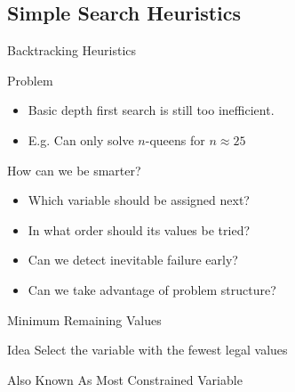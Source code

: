 \documentclass[14pt]{beamer}
\begin{document}
\subsection{Simple Search Heuristics}
\begin{frame}{Backtracking Heuristics}
	\begin{block}{Problem}
		\begin{itemize}
			\item Basic depth first search is still too inefficient.
			\item E.g. Can only solve $n$-queens for $n \approx 25$
		\end{itemize}
	\end{block}
	\begin{block}{How can we be smarter?}
		\begin{itemize}
			\pause
			\item Which variable should be assigned next?
			\pause
			\item In what order should its values be tried?
			\pause
			\item Can we detect inevitable failure early?
			\pause
			\item Can we take advantage of problem structure?
		\end{itemize}
	\end{block}
\end{frame}
\begin{frame}{Minimum Remaining Values}
	\begin{block}{Idea}
		Select the variable with the fewest legal values \\
	\end{block}
	\pause
	\begin{center}
	\end{center}
	\pause
	\begin{block}{Also Known As}
		Most Constrained Variable
	\end{block}
\end{frame}
\end{document}
